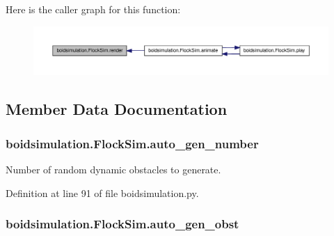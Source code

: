 Here is the caller graph for this function\-:\nopagebreak
\begin{figure}[H]
\begin{center}
\leavevmode
\includegraphics[width=350pt]{classboidsimulation_1_1FlockSim_a3c456990ff58b2a5dfae2dd2b5b6d294_icgraph}
\end{center}
\end{figure}




\subsection{Member Data Documentation}
\hypertarget{classboidsimulation_1_1FlockSim_a5e3ffa324294845eae535cb615e86856}{
\subsubsection[{auto\-\_\-gen\-\_\-number}]{\setlength{\rightskip}{0pt plus 5cm}boidsimulation.\-Flock\-Sim.\-auto\-\_\-gen\-\_\-number}}\label{classboidsimulation_1_1FlockSim_a5e3ffa324294845eae535cb615e86856}


Number of random dynamic obstacles to generate. 



Definition at line 91 of file boidsimulation.\-py.

\hypertarget{classboidsimulation_1_1FlockSim_a5e1ed98764e3cd800edaa7a904eacd15}{
\subsubsection[{auto\-\_\-gen\-\_\-obst}]{\setlength{\rightskip}{0pt plus 5cm}boidsimulation.\-Flock\-Sim.\-auto\-\_\-gen\-\_\-obst}}\label{classboidsimulation_1_1FlockSim_a5e1ed98764e3cd800edaa7a904eacd15}


